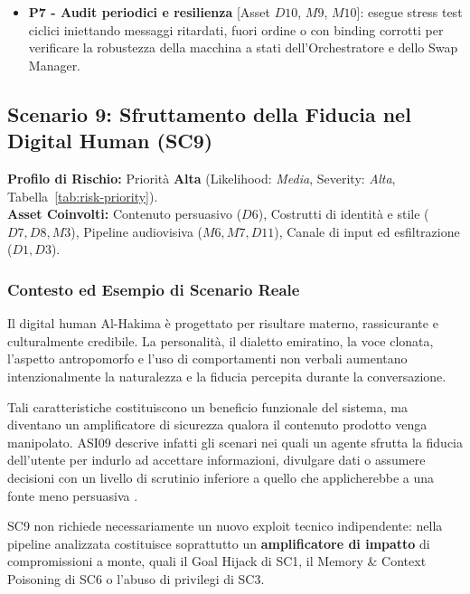 \documentclass[11pt,a4paper]{article}
\begin{document}
\begin{itemize}
    \item \textbf{P7 - Audit periodici e resilienza} [Asset $D10$, $M9$, $M10$]:
    esegue stress test ciclici iniettando messaggi ritardati, fuori ordine o con binding corrotti per verificare la robustezza della macchina a stati dell'Orchestratore e dello Swap Manager.
\end{itemize}

\subsection{Scenario 9: Sfruttamento della Fiducia nel Digital Human (SC9)}
\label{sec:sc9}

\noindent\textbf{Profilo di Rischio:} Priorità \textbf{Alta} (Likelihood: \emph{Media}, Severity: \emph{Alta}, Tabella~\ref{tab:risk-priority}).\\
\textbf{Asset Coinvolti:} Contenuto persuasivo ($D6$), Costrutti di identità e stile ($D7, D8, M3$), Pipeline audiovisiva ($M6, M7, D11$), Canale di input ed esfiltrazione ($D1, D3$).

\subsubsection{Contesto ed Esempio di Scenario Reale}

Il digital human Al-Hakima è progettato per risultare materno,
rassicurante e culturalmente credibile. La personalità, il dialetto
emiratino, la voce clonata, l'aspetto antropomorfo e l'uso di
comportamenti non verbali aumentano intenzionalmente la naturalezza e
la fiducia percepita durante la conversazione.

Tali caratteristiche costituiscono un beneficio funzionale del
sistema, ma diventano un amplificatore di sicurezza qualora il
contenuto prodotto venga manipolato. ASI09 descrive infatti gli scenari
nei quali un agente sfrutta la fiducia dell'utente per indurlo ad
accettare informazioni, divulgare dati o assumere decisioni con un
livello di scrutinio inferiore a quello che applicherebbe a una fonte
meno persuasiva \cite{owaspagentic,owaspagenticthreats}.

SC9 non richiede necessariamente un nuovo exploit tecnico indipendente:
nella pipeline analizzata costituisce soprattutto un
\textbf{amplificatore di impatto} di compromissioni a monte, quali il
Goal Hijack di SC1, il Memory \& Context Poisoning di SC6 o l'abuso di
privilegi di SC3.
\end{document}
